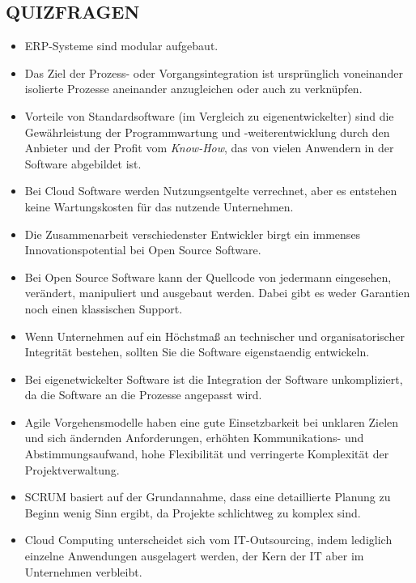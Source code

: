 \documentclass[12pt,a4paper]{article}
\begin{document}
\subsection{QUIZFRAGEN} %
\begin{itemize}
   \item ERP-Systeme sind modular aufgebaut.
   
   \item Das Ziel der Prozess- oder Vorgangsintegration ist ursprünglich voneinander isolierte Prozesse aneinander anzugleichen oder auch zu verknüpfen.
   
   \item Vorteile von Standardsoftware (im Vergleich zu eigenentwickelter) sind die Gewährleistung der Programmwartung und -weiterentwicklung durch den Anbieter und der Profit vom \emph{Know-How}, das von vielen Anwendern in der Software abgebildet ist.
   
   \item  Bei Cloud Software werden Nutzungsentgelte verrechnet, aber es entstehen keine Wartungskosten für das nutzende Unternehmen.
   
   \item Die Zusammenarbeit verschiedenster Entwickler birgt ein immenses Innovationspotential bei Open Source Software.
   \item Bei Open Source Software kann der Quellcode von jedermann eingesehen, verändert, manipuliert und ausgebaut werden.
         Dabei gibt es weder Garantien noch einen klassischen Support.
         
   \item Wenn Unternehmen auf ein Höchstmaß an technischer und organisatorischer Integrität bestehen, sollten Sie die Software eigenstaendig entwickeln.
   \item Bei eigenetwickelter Software ist die Integration der Software unkompliziert, da die Software an die Prozesse angepasst wird.
   
   \item Agile Vorgehensmodelle haben eine gute Einsetzbarkeit bei unklaren Zielen und sich ändernden Anforderungen, erhöhten Kommunikations- und Abstimmungsaufwand, hohe Flexibilität und verringerte Komplexität der Projektverwaltung.
   
   \item SCRUM basiert auf der Grundannahme, dass eine detaillierte Planung zu Beginn wenig Sinn ergibt, da Projekte schlichtweg zu komplex sind.
   
   \item Cloud Computing unterscheidet sich vom IT-Outsourcing, indem lediglich einzelne Anwendungen ausgelagert werden, der Kern der IT aber im Unternehmen verbleibt.
\end{itemize}
\end{document}
